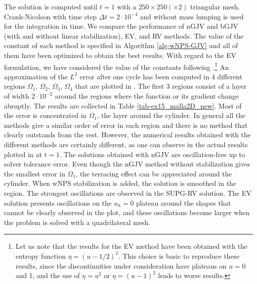The solution is computed until $t=1$ with a $250 \times 250 (\times 2)$ triangular mesh. Crank-Nicolson with time step $\Delta t = 2\cdot 10^{-4}$ and without mass lumping is used for the integration in time.  We compare the performance of nGJV and bGJV (with and without linear stabilization), EV, and RV  methods. The value of the constant of each method is specified in Algorithm \ref{alg-wNPS-GJV} and all of them have been optimized to obtain the best results. With regard to the EV formulation, we have considered the value of the constants following \cite{guermond_entropy_2011}.\footnote{Let us note that the results for the EV method have been obtained with the entropy function $\eta = (u- 1/2)^2$. This choice is basic to reproduce these results, since the discontinuities under consideration have plateaus on $u = 0$ and 1, and the use of $\eta = u^2$ or $\eta = (u-1)^2$ leads to worse results.} 
An approximation of the $L^2$ error after one cycle has been computed in $4$ different regions $\Omega_1$, $\Omega_2$, $\Omega_3$, $\Omega_4$ that are plotted in . The first $3$ regions consist of a layer of width $2\cdot 10^{-2}$ around the regions where the function or its gradient change abruptly. The results are collected in Table \ref{tab-ex15_malla2D_new}. Most of the error is concentrated in $\Omega_1$, the layer around the cylinder. In general all the methods give a similar order of error in each region and there is no method that clearly outstands from the rest.
However, the numerical results obtained with the different methods are certainly different, as one can observe in the actual results plotted in  at $t = 1$. The solutions obtained with nGJV are oscillation-free up to solver tolerance error. Even though the nGJV method without stabilization gives the smallest error in $\Omega_1$, the terracing effect can be appreciated around the cylinder. When wNPS stabilization is added, the solution is smoothed in the region. The strongest oscillations are observed in the SUPG-RV solution. The EV solution presents oscillations on the $u_h=0$ plateau around the shapes that cannot be clearly observed in the plot, and these oscillations become larger when the problem is solved with a quadrilateral mesh. 
